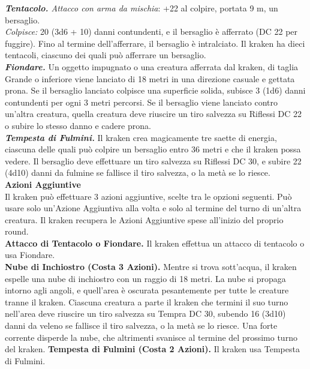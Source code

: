 \begin{multicols}{2}
\emph{\textbf{Tentacolo.} Attacco con arma da mischia}: +22 al colpire, portata 9 m, un bersaglio.\\

\emph{Colpisce:} 20 (3d6 + 10) danni contundenti, e il bersaglio è afferrato (DC  22 per fuggire). Fino al termine dell'afferrare, il bersaglio è intralciato. Il kraken ha dieci tentacoli, ciascuno dei quali può afferrare un bersaglio.\\

\emph{\textbf{Fiondare.}} Un oggetto impugnato o una creatura afferrata dal kraken, di taglia Grande o inferiore viene lanciato di 18 metri in una direzione casuale e gettata prona. Se il bersaglio lanciato colpisce una superficie solida, subisce 3 (1d6) danni contundenti per ogni 3 metri percorsi. Se il bersaglio viene lanciato contro un'altra creatura, quella creatura deve riuscire un tiro salvezza su Riflessi DC  22 o subire lo stesso danno e cadere prona.\\

\emph{\textbf{Tempesta di Fulmini.}} Il kraken crea magicamente tre saette di energia, ciascuna delle quali può colpire un bersaglio entro 36 metri e che il kraken possa vedere. Il bersaglio deve effettuare un tiro salvezza su Riflessi DC  30, e subire 22 (4d10) danni da fulmine se fallisce il tiro salvezza, o la metà se lo riesce.\\

\textbf{Azioni Aggiuntive}\\

Il kraken può effettuare 3 azioni aggiuntive, scelte tra le opzioni seguenti. Può usare solo un'Azione Aggiuntiva alla volta e solo al termine del turno di un'altra creatura. Il kraken recupera le Azioni Aggiuntive spese all'inizio del proprio round.\\

\textbf{Attacco di Tentacolo o Fiondare.} Il kraken effettua un attacco di tentacolo o usa Fiondare.\\

\textbf{Nube di Inchiostro (Costa 3 Azioni).} Mentre si trova sott'acqua, il kraken espelle una nube di inchiostro con un raggio di 18 metri. La nube si propaga intorno agli angoli, e quell'area è oscurata pesantemente per tutte le creature tranne il kraken. Ciascuna creatura a parte il kraken che termini il suo turno nell'area deve riuscire un tiro salvezza su Tempra DC  30, subendo 16 (3d10) danni da veleno se fallisce il tiro salvezza, o la metà se lo riesce. Una forte corrente disperde la nube, che altrimenti svanisce al termine del prossimo turno del kraken. \textbf{Tempesta di Fulmini (Costa 2 Azioni).} Il kraken usa Tempesta di Fulmini.\\


\end{multicols}
